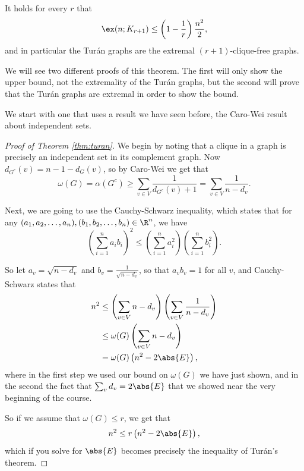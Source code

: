 \documentclass[nobib]{tufte-handout}
\begin{document}
\begin{theorem}[Turán, 1941]\label{thm:turan}
    It holds for every $r$ that
    $$\ex(n; K_{r+1}) \leq \left(1 - \frac{1}{r}\right)\frac{n^2}{2},$$
    and in particular the Turán graphs are the extremal $(r+1)$-clique-free graphs.
\end{theorem}

We will see two different proofs of this theorem. The first will only show the upper bound, not the extremality of the Turán graphs, but the second will prove that the Turán graphs are extremal in order to show the bound.

We start with one that uses a result we have seen before, the Caro-Wei result about independent sets.

\begin{proof}[Proof of Theorem \ref{thm:turan}]
    We begin by noting that a clique in a graph is precisely an independent set in its complement graph. Now $d_{G^c}(v) = n - 1 - d_{G}(v)$, so by Caro-Wei we get that
    $$\omega(G) = \alpha\left(G^c\right) \geq \sum_{v \in V} \frac{1}{d_{G^c}(v) + 1} = \sum_{v \in V} \frac{1}{n - d_v}.$$

    Next, we are going to use the Cauchy-Schwarz inequality, which states that for any $(a_1, a_2,\ldots, a_n), (b_1, b_2, \ldots, b_n) \in \R^n$, we have
    $$\left(\sum_{i=1}^{n} a_i b_i\right)^2 \leq \left(\sum_{i=1}^{n} a_i^2\right)\left(\sum_{i=1}^{n} b_i^2\right).$$

    So let $a_v = \sqrt{n - d_v}$ and $b_v = \frac{1}{\sqrt{n - d_v}}$, so that $a_v b_v = 1$ for all $v$, and Cauchy-Schwarz states that
    \begin{align*}
        n^2 &\leq \left(\sum_{v \in V} n - d_v\right)\left(\sum_{v \in V} \frac{1}{n - d_v}\right)\\
        &\leq \omega(G)\left(\sum_{v \in V} n - d_v\right)\\
        &= \omega(G)\left(n^2 - 2\abs{E}\right),
    \end{align*}
    where in the first step we used our bound on $\omega(G)$ we have just shown, and in the second the fact that $\sum_v d_v = 2\abs{E}$ that we showed near the very beginning of the course.

    So if we assume that $\omega(G) \leq r$, we get that
    $$n^2 \leq r\left(n^2 - 2\abs{E}\right),$$
    which if you solve for $\abs{E}$ becomes precisely the inequality of Turán's theorem.
\end{proof}
\end{document}
